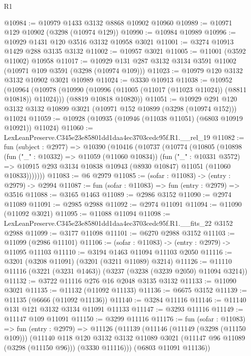 \begin{lexlean}{R1}
\begin{coremodule}
@10984 := @10979 @1433 @3132 @8868 @10902 @10960
@10989 := @10971 @129 @10902 (@3298 (@10974 @129))
@10990 := @10984 @10989
@10996 := @10929 @1431 @120 @3516 @3132 @10958 @3021
@11001 := @3274 @10913 @1429 @288 @3135 @3132
@11002 := @10957 @3021
@11005 := @11001 (@3592 @11002) @10958
@11017 := @10929 @131 @287 @3132 @3134 @3591 @11002 (@10971 @109 @3591 (@3298 (@10974 @109)))
@11023 := @10979 @120 @3132 @3132 @10902 @3021 @10989
@11024 := @3330 @10913
@11038 := @10952
    (@10964
      (@10978 (@10990 (@10996 (@11005 (@11017 (@11023 @11024)) (@8811 @10818)) @11024)))
      (@8819 @10818 @10820))
@11051 := @10929
    @291
    @120
    @3132
    @3132
    @10899
    @3021
    (@10971 @152 @10899 (@3298 (@10974 @152)))
    @11024
@11059 := @10928 (@10935 (@10946 (@11038 @11051) (@6803 @10919 @10921)) @11024)
@11060 := LexLeanPreserve.C345e23e85801dd1daa4ec3703cedc95f.R1.__rel_19
@11082 := fun (subject : @2977) =>
  @10390
    (@10416
      (@10737
        (@10774
          (@10805
            (@10898
              (fun ("_" : @10332) => @11059 (@11060 @10834))
              (fun ("_" : @10331 @3572) =>
              @10915 @293 @3134 @10838 @10943 (@8930 @10847) @11051 (@11060 @10833)))))))
@11083 := @6 @2979
@11085 := (sofar : @11083) -> (entry : @2979) -> @2994
@11087 := fun (sofar : @11083) => fun (entry : @2979) => @3516
@11088 := @3165 @1463
@11089 := @2986 @3152
@11090 := @2974 @11089
@11091 := @2985 @2988
@11092 := @2974 @11091
@11094 := @11090 (@11092 @3021)
@11095 := @11088 @11094
@11098 := LexLeanPreserve.C345e23e85801dd1daa4ec3703cedc95f.R1.__fits_22 @3152 @2988
@11099 := @3177 @11098
@11101 := @6270 @2988 @3152
@11103 := @11099 (@2986 @11101)
@11106 := (sofar : @11083) -> (entry : @2979) -> @11095 @11103
@11110 := @3194 @1463 @11094 @11103 @2050
@11116 := @3201 (@3208 @11091) (@3201 (@3211 @11089) @3214)
@11126 := @11110 @11116 (@3221 (@3231 @1463)) (@3237 (@3238 (@3239 @2050) @11094 @3214))
@11132 := @3722 @11116 @276 @16 @2048 @3135 @3132
@11133 := @11090 @3021
@11135 := @11132 (@11092 @11133)
@11136 := @6675 @3152
@11139 := @11135 (@6666 (@11092 @11136))
@11140 := @3284 @11116
@11146 := @11140 @131 @121 @3132 @3134 @11091 @11133
@11147 := @3293 @11116
@11149 := @11147 @109 @11091
@11150 := @3299 @11116
@11176 := fun (sofar : @11083) =>
  fun (entry : @2979) =>
  @11126
    (@11139
      (@11146
        (@11149 (@3298 (@11150 @109)))
        (@11140
          @118
          @120
          @3132
          @3132
          @11089
          @3021
          (@11147 @96 @11089 (@3298 (@11150 @96)))
          (@3330 @11116)))
      (@6803 @11091 @11136))

\end{coremodule}
\end{lexlean}
